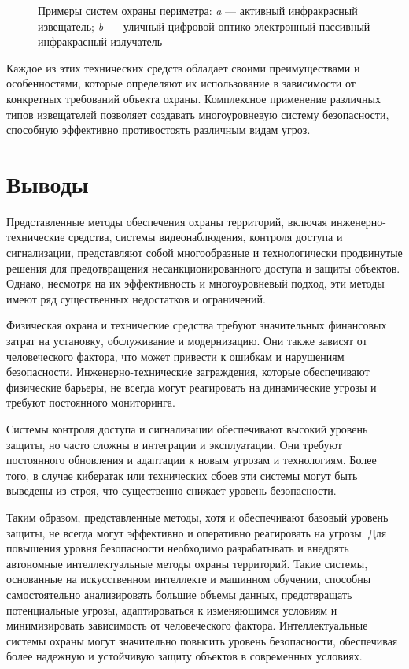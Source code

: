 \begin{figure}[!htbp]
\begin{subfigure}[t]{\dimexpr.5\linewidth-1.3em\relax}
	\end{subfigure}
\captionsetup{justification=centering} %
	\caption{Примеры систем охраны периметра: {\itshape a} --- активный инфракрасный извещатель; {\itshape b}~--- уличный цифровой оптико-электронный пассивный инфракрасный излучатель}\label{fig:two_izvesh} 
\end{figure}

Каждое из этих технических средств обладает своими преимуществами и особенностями, которые определяют их использование в зависимости от конкретных требований объекта охраны. Комплексное применение различных типов извещателей позволяет создавать многоуровневую систему безопасности, способную эффективно противостоять различным видам угроз.


\section{Выводы} \label{ch1:conclusion}
Представленные методы обеспечения охраны территорий, включая инженерно-технические средства, системы видеонаблюдения, контроля доступа и сигнализации, представляют собой многообразные и технологически продвинутые решения для предотвращения несанкционированного доступа и защиты объектов. Однако, несмотря на их эффективность и многоуровневый подход, эти методы имеют ряд существенных недостатков и ограничений.

Физическая охрана и технические средства требуют значительных финансовых затрат на установку, обслуживание и модернизацию. Они также зависят от человеческого фактора, что может привести к ошибкам и нарушениям безопасности. Инженерно-технические заграждения, которые обеспечивают физические барьеры, не всегда могут реагировать на динамические угрозы и требуют постоянного мониторинга.

Системы контроля доступа и сигнализации обеспечивают высокий уровень защиты, но часто сложны в интеграции и эксплуатации. Они требуют постоянного обновления и адаптации к новым угрозам и технологиям. Более того, в случае кибератак или технических сбоев эти системы могут быть выведены из строя, что существенно снижает уровень безопасности.

Таким образом, представленные методы, хотя и обеспечивают базовый уровень защиты, не всегда могут эффективно и оперативно реагировать на угрозы. Для повышения уровня безопасности необходимо разрабатывать и внедрять автономные интеллектуальные методы охраны территорий. Такие системы, основанные на искусственном интеллекте и машинном обучении, способны самостоятельно анализировать большие объемы данных, предотвращать потенциальные угрозы, адаптироваться к изменяющимся условиям и минимизировать зависимость от человеческого фактора. Интеллектуальные системы охраны могут значительно повысить уровень безопасности, обеспечивая более надежную и устойчивую защиту объектов в современных условиях.
